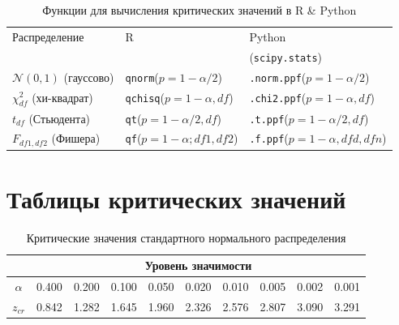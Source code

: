 \documentclass[12pt]{article}
\begin{document}
\begin{table}[h]
\caption{Функции для вычисления критических значений в R \& Python}
\begin{center}
\begin{tabular}{|l|l|l|}\hline
	Распределение & R & Python \\
	& & (\texttt{scipy.stats}) \\
	\hline\hline
	\(\mathcal{N}(0,1)\) (гауссово) & \texttt{qnorm}($p=1-\alpha/2$) & \texttt{.norm.ppf}($p=1-\alpha/2$)\\ \hline
	\(\chi^2_{df}\) (хи-квадрат) & \texttt{qchisq}($p=1-\alpha, df$) & \texttt{.chi2.ppf}($p=1-\alpha,df$) \\ \hline
	\(t_{df}\) (Стьюдента) & \texttt{qt}($p=1-\alpha/2,df$) & \texttt{.t.ppf}($p=1-\alpha/2,df$) \\ \hline
	\(F_{df1,df2}\) (Фишера) & \texttt{qf}($p=1-\alpha;df1,df2$) & \texttt{.f.ppf}($p=1-\alpha,dfd,dfn$) \\
	\hline
\end{tabular}
\end{center}
\end{table}

\newpage

\section{Таблицы критических значений}

\begin{table}[h]
\caption{Критические значения стандартного нормального распределения}
{\small \begin{center}
\begin{tabular}{|c|c|c|c|c|c|c|c|c|c|}
	\hline
	& \multicolumn{9}{c|}{Уровень значимости } \\ \hline
	$\alpha$ &  0.400 &  0.200 &  0.100 &  0.050 &  0.020 &  0.010 & 0.005 &0.002 & 0.001\\ \hline
	$z_{cr}$ &  0.842 &  1.282 &  1.645 &  1.960 & 2.326& 2.576& 2.807& 3.090 & 3.291\\
	\hline
\end{tabular}
\end{center} }
\end{table}

\end{document}
